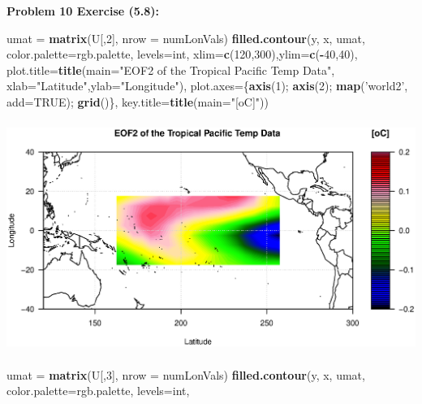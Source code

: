 \documentclass[11pt]{article}
\newenvironment{problem}[1]{\textbf{Problem #1: }}{\newpage}
\newenvironment{Shaded}{\begin{snugshade}}{\end{snugshade}}
\newcommand{\DataTypeTok}[1]{\textcolor[rgb]{0.13,0.29,0.53}{#1}}
\newcommand{\DecValTok}[1]{\textcolor[rgb]{0.00,0.00,0.81}{#1}}
\newcommand{\KeywordTok}[1]{\textcolor[rgb]{0.13,0.29,0.53}{\textbf{#1}}}
\newcommand{\NormalTok}[1]{#1}
\newcommand{\OperatorTok}[1]{\textcolor[rgb]{0.81,0.36,0.00}{\textbf{#1}}}
\newcommand{\OtherTok}[1]{\textcolor[rgb]{0.56,0.35,0.01}{#1}}
\newcommand{\StringTok}[1]{\textcolor[rgb]{0.31,0.60,0.02}{#1}}
\begin{document}
\begin{problem}{10 Exercise (5.8)}
\begin{enumerate}[label = (\alph*)]
			\newpage
\begin{Shaded}
\begin{Highlighting}[]
\NormalTok{umat =}\StringTok{ }\KeywordTok{matrix}\NormalTok{(U[,}\DecValTok{2}\NormalTok{], }\DataTypeTok{nrow =}\NormalTok{ numLonVals)}
\KeywordTok{filled.contour}\NormalTok{(y, x, umat, }\DataTypeTok{color.palette=}\NormalTok{rgb.palette, }\DataTypeTok{levels=}\NormalTok{int,}
               \DataTypeTok{xlim=}\KeywordTok{c}\NormalTok{(}\DecValTok{120}\NormalTok{,}\DecValTok{300}\NormalTok{),}\DataTypeTok{ylim=}\KeywordTok{c}\NormalTok{(}\OperatorTok{-}\DecValTok{40}\NormalTok{,}\DecValTok{40}\NormalTok{),}
               \DataTypeTok{plot.title=}\KeywordTok{title}\NormalTok{(}\DataTypeTok{main=}\StringTok{"EOF2 of the Tropical Pacific Temp Data"}\NormalTok{,}
                                \DataTypeTok{xlab=}\StringTok{"Latitude"}\NormalTok{,}\DataTypeTok{ylab=}\StringTok{"Longitude"}\NormalTok{),}
               \DataTypeTok{plot.axes=}\NormalTok{\{}\KeywordTok{axis}\NormalTok{(}\DecValTok{1}\NormalTok{); }\KeywordTok{axis}\NormalTok{(}\DecValTok{2}\NormalTok{); }\KeywordTok{map}\NormalTok{(}\StringTok{'world2'}\NormalTok{, }\DataTypeTok{add=}\OtherTok{TRUE}\NormalTok{); }\KeywordTok{grid}\NormalTok{()\},}
               \DataTypeTok{key.title=}\KeywordTok{title}\NormalTok{(}\DataTypeTok{main=}\StringTok{"[oC]"}\NormalTok{))}
\end{Highlighting}
\end{Shaded}
\includegraphics[height = 7.5cm]{Photos/EOF2}
\begin{Shaded}
\begin{Highlighting}[]
\NormalTok{umat =}\StringTok{ }\KeywordTok{matrix}\NormalTok{(U[,}\DecValTok{3}\NormalTok{], }\DataTypeTok{nrow =}\NormalTok{ numLonVals)}
\KeywordTok{filled.contour}\NormalTok{(y, x, umat, }\DataTypeTok{color.palette=}\NormalTok{rgb.palette, }\DataTypeTok{levels=}\NormalTok{int,}

\end{Highlighting}
\end{Shaded}
\end{enumerate}
\end{problem}
\end{document}
